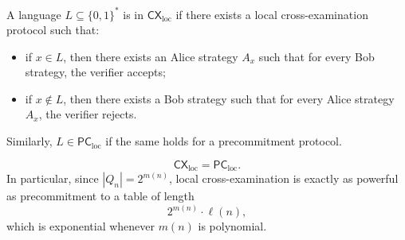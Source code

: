 \documentclass[11pt]{article}
\begin{document}
\begin{definition}
A language \(L\subseteq\{0,1\}^*\) is in \(\mathsf{CX}_{\mathrm{loc}}\) if there exists a
local cross-examination protocol such that:

\begin{itemize}
    \item if \(x\in L\), then there exists an Alice strategy \(A_x\) such that for every
    Bob strategy, the verifier accepts;
    \item if \(x\notin L\), then there exists a Bob strategy such that for every Alice
    strategy \(A_x\), the verifier rejects.
\end{itemize}

Similarly, \(L\in \mathsf{PC}_{\mathrm{loc}}\) if the same holds for a precommitment
protocol.
\end{definition}

\begin{theorem}
\[
\mathsf{CX}_{\mathrm{loc}} = \mathsf{PC}_{\mathrm{loc}}.
\]
In particular, since \(|Q_n| = 2^{m(n)}\), local cross-examination is exactly as
powerful as precommitment to a table of length
\[
2^{m(n)}\cdot \ell(n),
\]
which is exponential whenever \(m(n)\) is polynomial.
\end{theorem}
\end{document}
